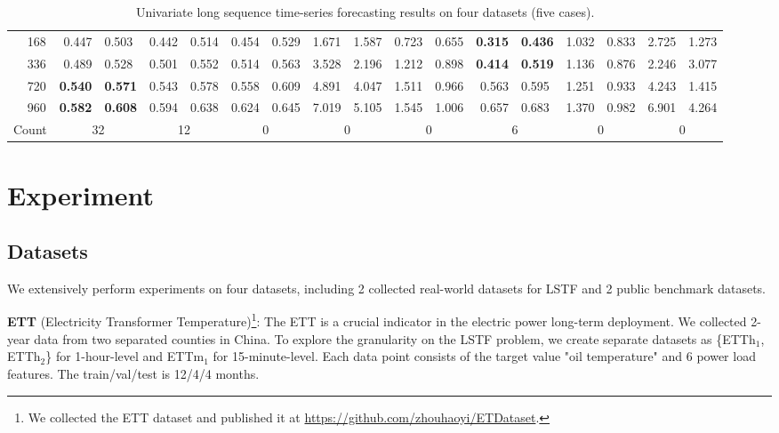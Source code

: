 \begin{table*}[t]
\begin{tabular}{c|c|c|c|c|c|c|c|c|c}
	 & 	168	 & 	0.447~~0.503	 & 	0.442~~0.514	 & 	0.454~~0.529	 & 	1.671~~1.587	 & 	0.723~~0.655	 & 	\textbf{0.315}~~\textbf{0.436}	 & 	1.032~~0.833	 & 	2.725~~1.273\\
	 & 	336	 & 	0.489~~0.528	 & 	0.501~~0.552	 & 	0.514~~0.563	 & 	3.528~~2.196	 & 	1.212~~0.898	 & 	\textbf{0.414}~~\textbf{0.519}	 & 	1.136~~0.876	 & 	2.246~~3.077\\
	 & 	720	 & 	\textbf{0.540}~~\textbf{0.571}	 & 	0.543~~0.578	 & 	0.558~~0.609	 & 	4.891~~4.047	 & 	1.511~~0.966	 & 	0.563~~0.595	 & 	1.251~~0.933	 & 	4.243~~1.415\\
	 & 	960	 & 	\textbf{0.582}~~\textbf{0.608}	 & 	0.594~~0.638	 & 	0.624~~0.645	 & 	7.019~~5.105	 & 	1.545~~1.006	 & 	0.657~~0.683	 & 	1.370~~0.982	 & 	6.901~~4.264\\

\midrule[1.0pt]
\multicolumn{2}{c|}{Count}           & {32}                 & {12}                          & {0}        & {0}        & {0}     & {6}           & {0}     & {0}      \\
\bottomrule[1.0pt]

\end{tabular}
\caption{Univariate long sequence time-series forecasting results on four datasets (five cases).}
\label{tab:exp.mainResults}
\end{table*}

\section{Experiment}
\label{sec:exp}

\subsection{Datasets}
We extensively perform experiments on four datasets, including 2 collected real-world datasets for LSTF and 2 public benchmark datasets.

\textbf{ETT} (Electricity Transformer Temperature)\footnote{We collected the ETT dataset and published it at \url{https://github.com/zhouhaoyi/ETDataset}.}:
The ETT is a crucial indicator in the electric power long-term deployment.
We collected 2-year data from two separated counties in China. To explore the granularity on the LSTF problem, we create separate datasets as \{ETTh$_1$, ETTh$_2$\} for 1-hour-level and ETTm$_1$ for 15-minute-level.
Each data point consists of the target value "oil temperature" and 6 power load features.
The train/val/test is 12/4/4 months.

